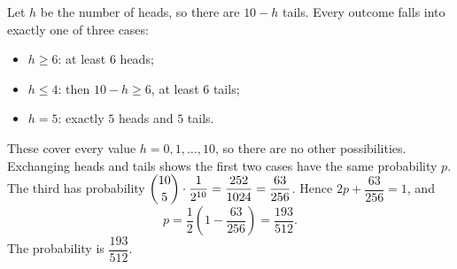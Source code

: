Let $h$ be the number of heads, so there are $10-h$ tails. Every outcome falls into exactly one of three cases:
\begin{itemize}
\item $h\ge6$: at least $6$ heads;
\item $h\le4$: then $10-h\ge6$, at least $6$ tails;
\item $h=5$: exactly $5$ heads and $5$ tails.
\end{itemize}
These cover every value $h=0,1,\dots,10$, so there are no other possibilities. Exchanging heads and tails shows the first two cases have the same probability $p$. The third has probability $\dbinom{10}{5}\cdot\dfrac{1}{2^{10}}=\dfrac{252}{1024}=\dfrac{63}{256}$. Hence $2p+\dfrac{63}{256}=1$, and
\[
p=\dfrac{1}{2}\left(1-\dfrac{63}{256}\right)=\dfrac{193}{512}.
\]
The probability is $\boxed{\dfrac{193}{512}}$.
